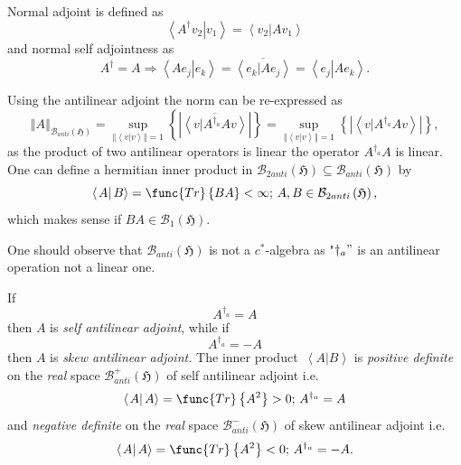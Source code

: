\documentclass[aps,preprint]{revtex4}
\begin{document}
Normal adjoint is defined as 
\begin{equation}
\left\langle \left. A^{\dagger}v_{2}\right\vert v_{1}\right\rangle
=\left\langle \left. v_{2}\right\vert Av_{1}\right\rangle
\end{equation}
and normal self adjointness as 
\begin{equation}
A^{\dagger}=A\Rightarrow\left\langle \left. Ae_{j}\right\vert
e_{k}\right\rangle =\overline{\left\langle \left. e_{k}\right\vert
Ae_{j}\right\rangle }=\left\langle \left. e_{j}\right\vert
Ae_{k}\right\rangle .
\end{equation}

Using the antilinear adjoint the norm can be re-expressed as 
\begin{equation}
\left\Vert A\right\Vert _{\mathcal{B}_{anti}\left( \mathfrak{H}\right)
}=\sup\limits_{\left\Vert \left\langle \left. v\right\vert v\right\rangle
\right\Vert =1}\left\{ \left\vert \overline{\left\langle \left. v\right\vert
A^{\dagger_{a}}Av\right\rangle }\right\vert \right\}
=\sup\limits_{\left\Vert \left\langle \left. v\right\vert v\right\rangle
\right\Vert =1}\left\{ \left\vert \left\langle \left. v\right\vert
A^{\dagger_{a}}Av\right\rangle \right\vert \right\} ,
\end{equation}
as the product of two antilinear operators is linear the operator $%
A^{\dagger_{a}}A$ is linear$.$ One can define a hermitian inner product in $%
\mathcal{B}_{2anti}\left( \mathfrak{H}\right) \subseteq\mathcal{B}%
_{anti}\left( \mathfrak{H}\right) $ by 
\begin{equation}
\left\langle \left. A\right\vert B\right\rangle =\func{Tr}\left\{ BA\right\}
<\infty;\,A,B\in\mathcal{B}_{2anti}\left( \mathfrak{H}\right) ,
\end{equation}
which makes sense if $BA\in\mathcal{B}_{1}\left( \mathfrak{H}\right) .$

One should observe that $\mathcal{B}_{anti}\left( \mathfrak{H}\right) $ is
not a $c^{\ast}$-algebra as "$\dagger_{a}"$ is an antilinear operation not a
linear one.

If 
\begin{equation}
A^{\dagger_{a}}=A
\end{equation}
then $A$ is \emph{self antilinear adjoint}, while if 
\begin{equation}
A^{\dagger_{a}}=-A
\end{equation}
then $A$ is \emph{skew antilinear adjoint. }The inner product\emph{\ }$%
\left\langle \left. A\right\vert B\right\rangle $ is \emph{positive definite}
on the \emph{real} space $\mathcal{B}_{anti}^{+}\left( \mathfrak{H}\right) $
of self antilinear adjoint i.e. 
\begin{equation}
\left\langle \left. A\right\vert A\right\rangle =\func{Tr}\left\{
A^{2}\right\} >0;\,A^{\dagger_{a}}=A
\end{equation}
and \emph{negative definite} on the \emph{real} space $\mathcal{B}%
_{anti}^{-}\left( \mathfrak{H}\right) $ of skew antilinear adjoint i.e. 
\begin{equation}
\left\langle \left. A\right\vert A\right\rangle =\func{Tr}\left\{
A^{2}\right\} <0;\,A^{\dagger_{a}}=-A.
\end{equation}
\end{document}

